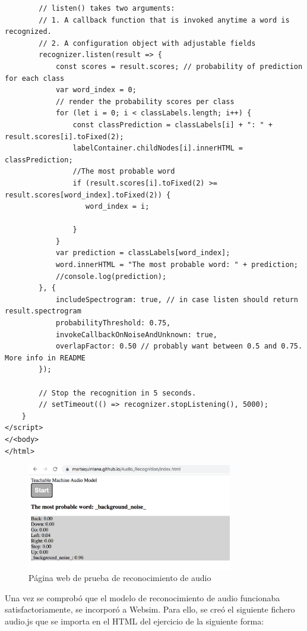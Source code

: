 \begin{lstlisting}
        // listen() takes two arguments:
        // 1. A callback function that is invoked anytime a word is recognized.
        // 2. A configuration object with adjustable fields
        recognizer.listen(result => {
            const scores = result.scores; // probability of prediction for each class
            var word_index = 0;
            // render the probability scores per class
            for (let i = 0; i < classLabels.length; i++) {
                const classPrediction = classLabels[i] + ": " + result.scores[i].toFixed(2);
                labelContainer.childNodes[i].innerHTML = classPrediction;
                //The most probable word
                if (result.scores[i].toFixed(2) >= result.scores[word_index].toFixed(2)) {
                   word_index = i;

                }
            }
            var prediction = classLabels[word_index];
            word.innerHTML = "The most probable word: " + prediction;
            //console.log(prediction);
        }, {
            includeSpectrogram: true, // in case listen should return result.spectrogram
            probabilityThreshold: 0.75,
            invokeCallbackOnNoiseAndUnknown: true,
            overlapFactor: 0.50 // probably want between 0.5 and 0.75. More info in README
        });

        // Stop the recognition in 5 seconds.
        // setTimeout(() => recognizer.stopListening(), 5000);
    }
</script>
</<body>
</html>

\end{lstlisting}


\begin{figure}[H]
    \centering
    \includegraphics[width=0.8\textwidth, height=0.4\textwidth]{chapters/images/audioprueba.png}
    \caption{Página web de prueba de reconocimiento de audio}
    \label{fig:my_label}
\end{figure}

Una vez se comprobó que el modelo de reconocimiento de audio funcionaba satisfactoriamente, se incorporó a Websim. Para ello, se creó el siguiente fichero audio.js que se importa en el HTML del ejercicio de la siguiente forma:   


